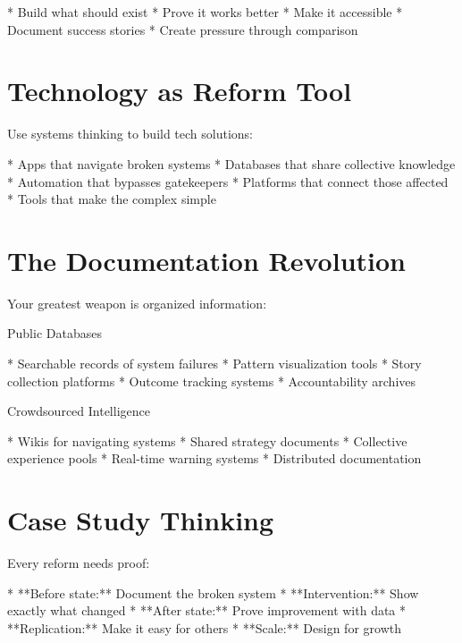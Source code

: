 \documentclass[12pt,oneside]{book}
\begin{document}
                    * Build what should exist
                    * Prove it works better
                    * Make it accessible
                    * Document success stories
                    * Create pressure through comparison

\section{Technology as Reform Tool}

Use systems thinking to build tech solutions:

                    * Apps that navigate broken systems
                    * Databases that share collective knowledge
                    * Automation that bypasses gatekeepers
                    * Platforms that connect those affected
                    * Tools that make the complex simple

\section{The Documentation Revolution}

Your greatest weapon is organized information:

                Public Databases

                    * Searchable records of system failures
                    * Pattern visualization tools
                    * Story collection platforms
                    * Outcome tracking systems
                    * Accountability archives

                Crowdsourced Intelligence

                    * Wikis for navigating systems
                    * Shared strategy documents
                    * Collective experience pools
                    * Real-time warning systems
                    * Distributed documentation

\section{Case Study Thinking}

Every reform needs proof:

                    * **Before state:** Document the broken system
                    * **Intervention:** Show exactly what changed
                    * **After state:** Prove improvement with data
                    * **Replication:** Make it easy for others
                    * **Scale:** Design for growth
\end{document}
